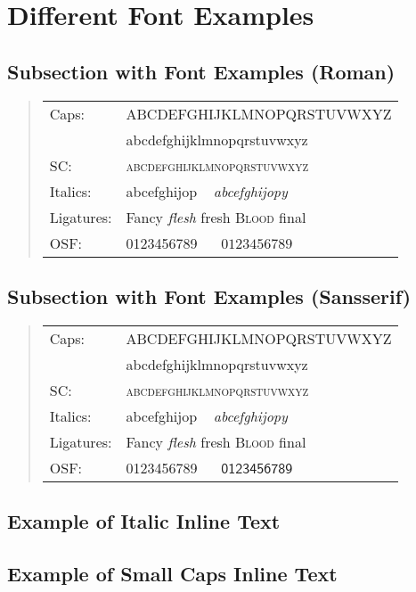 

\newcommand*{\abc}{abcdefghijklmnopqrstuvwxyz}
\newcommand*{\ABC}{ABCDEFGHIJKLMNOPQRSTUVWXYZ}


\section{Different Font Examples}


\subsection{Subsection with Font Examples (Roman)}

\begin{quotation}
\noindent
\large
\begin{tabular}{l l}
Caps:    & \ABC \\
         & \abc \\
SC:      & \textsc{\abc} \\
Italics: & abcefghijop ~ \textit{abcefghijopy} \\
Ligatures: & Fancy \textit{flesh} fresh \textsc{Blood} final\\
OSF:     & 0123456789 ~~ $0123456789$ \\
\end{tabular}
\end{quotation}


\subsection{Subsection with Font Examples (Sansserif)}

\begin{quotation}
\noindent
\large
\sffamily
\begin{tabular}{l l}
Caps:    & \ABC \\
         & \abc \\
SC:      & \textsc{\abc} \\
Italics: & abcefghijop ~ \textit{abcefghijopy} \\
Ligatures: & Fancy \textit{flesh} fresh \textsc{Blood} final\\
OSF:     & 0123456789 ~~ $\mathsf{0123456789}$ \\
\end{tabular}
\end{quotation}


\subsection{Example of Italic Inline Text}
\renewcommand{\blindmarkup}[1]{\emph{#1}}
\blindtext


\subsection{Example of Small Caps Inline Text}
\renewcommand{\blindmarkup}[1]{\textsc{#1}}
\blindtext

\renewcommand{\blindmarkup}[1]{}
